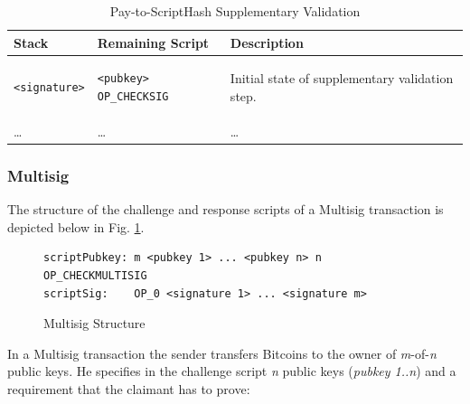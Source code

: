 \begin{table}[!h]  
	
	\centering
	\begin{tabular}{| m{105pt} | m{135pt} | m{100pt} |}
		\hline
		\textbf{Stack} & \textbf{Remaining Script} & \textbf{Description} \\ \hline \hline
		
		\vspace{8pt}
\begin{BVerbatim}[fontsize==\relsize{-4}]
<signature>
\end{BVerbatim} 
		\vspace{4pt}
		&
		\vspace{8pt}
\begin{BVerbatim}[fontsize==\relsize{-4}]
<pubkey> OP_CHECKSIG
\end{BVerbatim} 
		\vspace{4pt}
		&
		Initial state of supplementary validation step.\\ \hline
		
		\dots & \dots & \dots \\ \hline
	\end{tabular}
	
\vspace{5pt}
\caption{Pay-to-ScriptHash Supplementary Validation}
\label{tab:P2ScriptHash3}
\end{table}


\clearpage
\subsubsection{Multisig} \label{sec:Multisig}
The structure of the challenge and response scripts of a Multisig transaction is depicted below in Fig. \ref{fig:P2Multisig}.

\vspace{-10pt}
\begin{figure}[htbp]

\begin{Verbatim}[fontsize==\relsize{-4}, frame=single]  
scriptPubkey: m <pubkey 1> ... <pubkey n> n OP_CHECKMULTISIG
scriptSig:    OP_0 <signature 1> ... <signature m>
\end{Verbatim}

\vspace{-15pt}
\caption{Multisig Structure}
\label{fig:P2Multisig}
\end{figure}
\vspace{-10pt}

\noindent
In a Multisig transaction the sender transfers Bitcoins to the owner of \textit{m}-of-\textit{n} public keys. He specifies in the challenge script \textit{n} public keys (\textit{pubkey 1..n}) and a requirement that the claimant has to prove:


